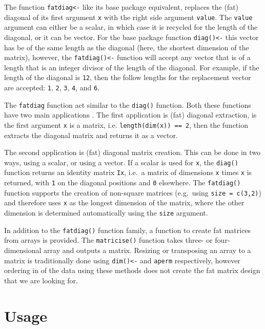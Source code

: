 \documentclass[article]{jss}
\begin{document}
The function \texttt{fatdiag\textless{}-} like its base package
equivalent, replaces the (fat) diagonal of its first argument \texttt{x}
with the right side argument \texttt{value}. The \texttt{value} argument
can either be a scalar, in which case it is recycled for the length of
the diagonal, or it can be vector. For the base package function
\texttt{diag()\textless{}-} this vector has be of the same length as the
diagonal (here, the shortest dimension of the matrix), however, the
\texttt{fatdiag()\textless{}-} function will accept any vector that is
of a length that is an integer divisor of the length of the diagonal.
For example, if the length of the diagonal is \texttt{12}, then the
follow lengths for the replacement vector are accepted: \texttt{1},
\texttt{2}, \texttt{3}, \texttt{4}, and \texttt{6}.

The \texttt{fatdiag} function act similar to the \texttt{diag()}
function. Both these functions have two main applications . The first
application is (fat) diagonal extraction, is the first argument
\texttt{x} is a matrix, i.e. \texttt{length(dim(x)) == 2}, then the
function extracts the diagonal matrix and returns it as a vector.

The second application is (fat) diagonal matrix creation. This can be
done in two ways, using a scalar, or using a vector. If a scalar is used
for \texttt{x}, the \texttt{diag()} function returns an identity matrix
\texttt{Ix}, i.e.~a matrix of dimensions \texttt{x} times \texttt{x} is
returned, with \texttt{1} on the diagonal positions and \texttt{0}
elsewhere. The \texttt{fatdiag()} function supports the creation of
non-square matrices (e.g.~using \texttt{size = c(3,2)}) and therefore
uses \texttt{x} as the longest dimension of the matrix, where the other
dimension is determined automatically using the \texttt{size} argument.

In addition to the \texttt{fatdiag()} function family, a function to
create fat matrices from arrays is provided. The \texttt{matricise()}
function takes three- or four-dimensional array and outputs a matrix.
Resizing or transposing an array to a matrix is traditionally done using
\texttt{dim()\textless{}-} and \texttt{aperm} respectively, however
ordering in of the data using these methods does not create the fat
matrix design that we are looking for.

\section{Usage}\label{usage}
\end{document}

